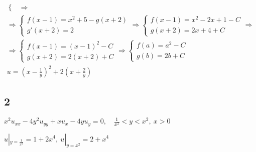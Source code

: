 \begin{enumerate}
\begin{gather*}
\begin{cases}
  \end{cases} \Rightarrow \\ \Rightarrow \begin{cases}
  f(x-1) = x^{2}+5-g(x+2) \\ g'(x+2) = 2
  \end{cases} \Rightarrow \begin{cases}
    f(x-1) = x^{2} -2x + 1 - C \\ g(x+2) = 2x+4+C
  \end{cases} \Rightarrow \\ \Rightarrow \begin{cases}
    f(x-1)=(x-1)^{2}-C \\ g(x+2) = 2(x+2) +C
  \end{cases} \Rightarrow \begin{cases}
    f(a)=a^{2}-C \\ g(b) = 2b+C
  \end{cases} \\
  \boxed{u=(x- \frac{1}{y})^{2}+2(x+ \frac{2}{y})}
\end{gather*}
\end{enumerate}

\subsection{2}
$x^{2}u_{xx}-4y^{2}u_{yy}+xu_{x}-4yu_{y}=0, \quad \frac{1}{x^{2}}<y<x^{2}, \ x>0$ 

$u|_{y= \frac{1}{x^{2}}}= 1 +2x^{4}, \ u|_{y=x^{2}} = 2 + x^{4}$ 

